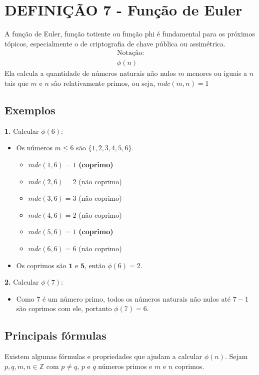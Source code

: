 \section*{DEFINIÇÃO 7 - Função de Euler}
A função de Euler, função totiente ou função phi é fundamental para os próximos tópicos, especialmente o de criptografia de chave pública ou assimétrica.
\begin{gather*}
    \text{Notação:}\\
    \phi(n)
\end{gather*}
Ela calcula a quantidade de números naturais não nulos $m$ menores ou iguais a $n$ tais que $m$ e $n$ são relativamente primos, ou seja, $mdc(m,n) = 1$

\subsection*{Exemplos}
\textbf{1.} Calcular $\phi(6)$:

\begin{itemize}
    \item Os números $m \leq 6$ são $\{1,2,3,4,5,6\}$.
          \begin{itemize}
              \item $mdc(1,6) = 1$ \textbf{(coprimo)}
              \item $mdc(2,6) = 2$ (não coprimo)
              \item $mdc(3,6) = 3$ (não coprimo)
              \item $mdc(4,6) = 2$ (não coprimo)
              \item $mdc(5,6) = 1$ \textbf{(coprimo)}
              \item $mdc(6,6) = 6$ (não coprimo)
          \end{itemize}
    \item Os coprimos são $\mathbf{1}$ e $\mathbf{5}$, então $\phi(6) = 2$.
\end{itemize}
\vspace{12pt}
\textbf{2.} Calcular $\phi(7)$:

\begin{itemize}
    \item Como 7 é um número primo, todos os números naturais não nulos até $7-1$ são coprimos com ele, portanto $\phi(7)=6$.
\end{itemize}

\subsection*{Principais fórmulas}
Existem algumas fórmulas e propriedades que ajudam a calcular $\phi(n)$. Sejam $p,q,m,n \in \mathbb{Z}$ com $p \neq q$, $p$ e $q$ números primos e $m$ e $n$ coprimos.

